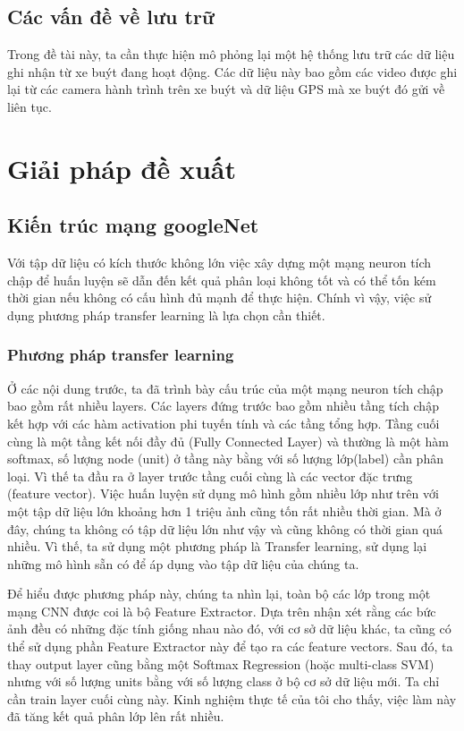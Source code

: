 	\subsection{Các vấn đề về lưu trữ}
	Trong đề tài này, ta cần thực hiện mô phỏng lại một hệ thống lưu trữ các dữ liệu ghi nhận từ xe buýt đang hoạt động. Các dữ liệu này bao gồm các video được ghi lại từ các camera hành trình trên xe buýt và dữ liệu GPS mà xe buýt đó gửi về liên tục.\par 	

\section{Giải pháp đề xuất}
	\subsection{Kiến trúc mạng googleNet}
	Với tập dữ liệu có kích thước không lớn việc xây dựng một mạng neuron tích chập để huấn luyện sẽ dẫn đến kết quả phân loại không tốt và có thể tốn kém thời gian nếu không có cấu hình đủ mạnh để thực hiện. Chính vì vậy, việc sử dụng phương pháp transfer learning là lựa chọn cần thiết.
	\subsubsection{Phương pháp transfer learning}
	Ở các nội dung trước, ta đã trình bày cấu trúc của một mạng neuron tích chập bao gồm rất nhiều layers. Các layers đứng trước bao gồm nhiều tầng tích chập kết hợp với các hàm activation phi tuyến tính và các tầng tổng hợp. Tầng cuối cùng là một tầng kết nối đầy đủ (Fully Connected Layer) và thường là một hàm softmax, số lượng node (unit) ở tầng này bằng với số lượng lớp(label) cần phân loại. Vì thế ta đầu ra ở layer trước tầng cuối cùng là các vector đặc trưng (feature vector). Việc huấn luyện sử dụng mô hình gồm nhiều lớp như trên với một tập dữ liệu lớn khoảng hơn 1 triệu ảnh cũng tốn rất nhiều thời gian. Mà ở đây, chúng ta không có tập dữ liệu lớn như vậy và cũng không có thời gian quá nhiều. Vì thế, ta sử dụng một phương pháp là Transfer learning, sử dụng lại những mô hình sẵn có để áp dụng vào tập dữ liệu của chúng ta.\par 
	Để hiểu được phương pháp này, chúng ta nhìn lại, toàn bộ các lớp trong một mạng CNN được coi là bộ Feature Extractor. Dựa trên nhận xét rằng các bức ảnh đều có những đặc tính giống nhau nào đó, với cơ sở dữ liệu khác, ta cũng có thể sử dụng phần Feature Extractor này để tạo ra các feature vectors. Sau đó, ta thay output layer cũng bằng một Softmax Regression (hoặc multi-class SVM) nhưng với số lượng units bằng với số lượng class ở bộ cơ sở dữ liệu mới. Ta chỉ cần train layer cuối cùng này. Kinh nghiệm thực tế của tôi cho thấy, việc làm này đã tăng kết quả phân lớp lên rất nhiều.
		
